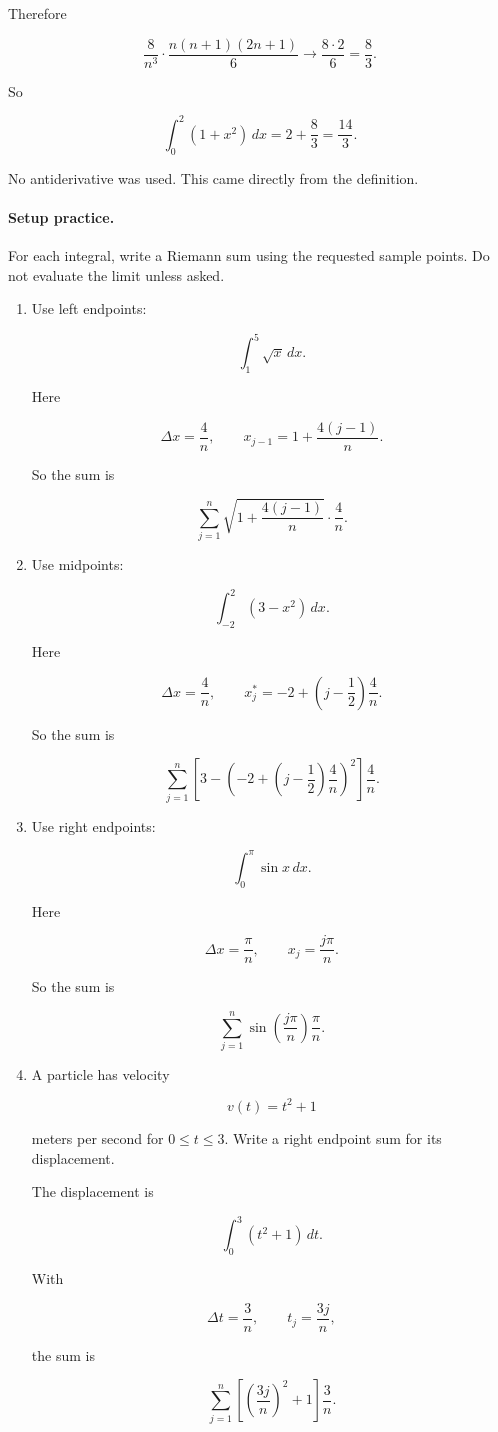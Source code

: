 Therefore

\[
\frac{8}{n^3}\cdot \frac{n(n+1)(2n+1)}{6}
\to
\frac{8\cdot2}{6}
=
\frac83.
\]

So

\[
\boxed{
\int_0^2 (1+x^2)\,dx
=
2+\frac83
=
\frac{14}{3}.
}
\]

No antiderivative was used.  This came directly from the definition.

\paragraph{Setup practice.}
For each integral, write a Riemann sum using the requested sample points.  Do not
evaluate the limit unless asked.

\begin{enumerate}
\item Use left endpoints:

\[
\int_1^5 \sqrt{x}\,dx.
\]

Here

\[
\Delta x=\frac4n,
\qquad
x_{j-1}=1+\frac{4(j-1)}{n}.
\]

So the sum is

\[
\sum_{j=1}^{n}
\sqrt{1+\frac{4(j-1)}{n}}\cdot \frac4n.
\]

\item Use midpoints:

\[
\int_{-2}^{2}(3-x^2)\,dx.
\]

Here

\[
\Delta x=\frac4n,
\qquad
x_j^*=-2+\left(j-\frac12\right)\frac4n.
\]

So the sum is

\[
\sum_{j=1}^{n}
\left[
3-
\left(
-2+\left(j-\frac12\right)\frac4n
\right)^2
\right]\frac4n.
\]

\item Use right endpoints:

\[
\int_0^\pi \sin x\,dx.
\]

Here

\[
\Delta x=\frac{\pi}{n},
\qquad
x_j=\frac{j\pi}{n}.
\]

So the sum is

\[
\sum_{j=1}^{n}
\sin\left(\frac{j\pi}{n}\right)\frac{\pi}{n}.
\]

\item A particle has velocity

\[
v(t)=t^2+1
\]

meters per second for \(0\le t\le3\).  Write a right endpoint sum for its displacement.

The displacement is

\[
\int_0^3 (t^2+1)\,dt.
\]

With

\[
\Delta t=\frac3n,
\qquad
t_j=\frac{3j}{n},
\]

the sum is

\[
\sum_{j=1}^{n}
\left[
\left(\frac{3j}{n}\right)^2+1
\right]\frac3n.
\]
\end{enumerate}


